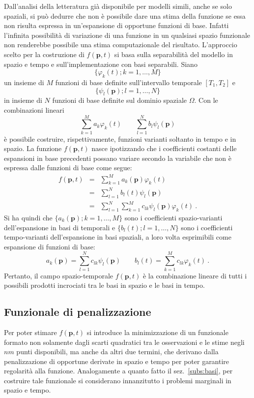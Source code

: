 \documentclass[a4paper,11pt,twoside,openright]{book}							%
\begin{document}
Dall'analisi della letteratura già disponibile per modelli simili, anche se solo spaziali, si può dedurre che non è possibile dare una stima della funzione se essa non risulta espressa in un'espansione di opportune funzioni di base. Infatti l'infinita possibilità di variazione di una funzione in un qualsiasi spazio funzionale non renderebbe possibile una stima computazionale del risultato. L'approccio scelto per la costruzione di $f(\bm p,t)$ si basa sulla separabilità del modello in spazio e tempo e sull'implementazione con basi separabili.
Siano 
$$
\{ \varphi_k(t);k=1, \ldots , M \}
$$
un insieme di $M$ funzioni di base definite sull'intervallo temporale $[T_1,T_2]$ e
$$
\{ \psi_l(\bm p);l=1, \ldots , N \}
$$
in insieme di $N$ funzioni di base definite sul dominio spaziale $\Omega$. Con le combinazioni lineari
$$
\sum_{k=1}^M a_k\varphi_k(t) \qquad \sum_{l=1}^N b_l\psi_l(\bm p)
$$
è possibile costruire, rispettivamente, funzioni varianti soltanto in tempo e in spazio. La funzione $f(\bm p,t)$ nasce ipotizzando che i coefficienti costanti delle espansioni in base precedenti possano variare secondo la variabile che non è espressa dalle funzioni di base come segue:
\begin{eqnarray}
f(\bm p, t) &=& \sum_{k=1}^M a_k(\bm p)\varphi_k(t) \label{eq:f_temp} \\
&=& \sum_{l=1}^N b_l(t)\psi_l(\bm p) \label{eq:f_space} \\ 
&=& \sum_{l=1}^N \sum_{k=1}^M c_{lk}\psi_l(\bm p)\varphi_k(t) \label{eq:basisexp}\ .
\end{eqnarray}
Si ha quindi che $\{ a_k(\bm p);k=1, \ldots , M \}$ sono i coefficienti spazio-varianti dell'espansione in basi di temporali e $\{ b_l(t);l=1, \ldots , N \}$ sono i coefficienti tempo-varianti dell'espansione in basi spaziali, a loro volta esprimibili come espansione di funzioni di base:
$$
a_k(\bm p)=\sum_{l=1}^N c_{lk}\psi_l(\bm p) \qquad b_l(t)=\sum_{k=1}^M c_{lk}\varphi_k(t) \ .
$$
Pertanto, il campo spazio-temporale $f(\bm p,t)$ è la combinazione lineare di tutti i possibili prodotti incrociati tra le basi in spazio e le basi in tempo. 

\subsection{Funzionale di penalizzazione}

Per poter stimare $f(\bm p,t)$ si introduce la minimizzazione di un funzionale formato non solamente dagli scarti quadratici tra le osservazioni e le stime negli $nm$ punti disponibili, ma anche da altri due termini, che derivano dalla penalizzazione di opportune derivate in spazio e tempo per poter garantire regolarità alla funzione. Analogamente a quanto fatto il sez.~\ref{subs:basi}, per costruire tale funzionale si considerano innanzitutto i problemi marginali in spazio e tempo.
\end{document}
